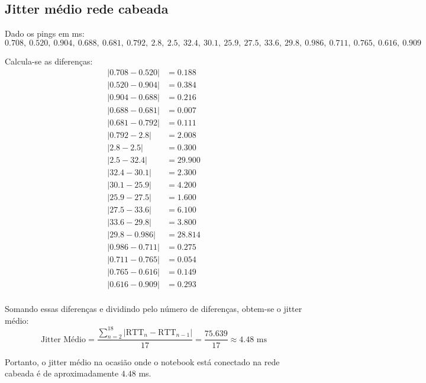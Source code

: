 \documentclass[a4paper,12pt]{article}
\begin{document}
\subsection*{Jitter médio rede cabeada}

Dado os pings em ms:
\[
0.708, \ 0.520, \ 0.904, \ 0.688, \ 0.681, \ 0.792, \ 2.8, \ 2.5, \ 32.4, \ 30.1,
\ 25.9, \ 27.5, \ 33.6, \ 29.8, \ 0.986, \ 0.711, \ 0.765, \ 0.616, \ 0.909
\]

Calcula-se as diferenças:
\[
\begin{align*}
|0.708 - 0.520| &= 0.188 \\
|0.520 - 0.904| &= 0.384 \\
|0.904 - 0.688| &= 0.216 \\
|0.688 - 0.681| &= 0.007 \\
|0.681 - 0.792| &= 0.111 \\
|0.792 - 2.8| &= 2.008 \\
|2.8 - 2.5| &= 0.300 \\
|2.5 - 32.4| &= 29.900 \\
|32.4 - 30.1| &= 2.300 \\
|30.1 - 25.9| &= 4.200 \\
|25.9 - 27.5| &= 1.600 \\
|27.5 - 33.6| &= 6.100 \\
|33.6 - 29.8| &= 3.800 \\
|29.8 - 0.986| &= 28.814 \\
|0.986 - 0.711| &= 0.275 \\
|0.711 - 0.765| &= 0.054 \\
|0.765 - 0.616| &= 0.149 \\
|0.616 - 0.909| &= 0.293 \\
\end{align*}
\]

Somando essas diferenças e dividindo pelo número de diferenças, obtem-se o jitter médio:
\[
\text{Jitter Médio} = \frac{\sum_{n=2}^{18} |\text{RTT}_n - \text{RTT}_{n-1}|}{17} = \frac{75.639}{17} \approx 4.48 \text{ ms}
\]

Portanto, o jitter médio na ocasião onde o notebook está conectado na rede cabeada é de aproximadamente \( 4.48 \) ms.
\end{document}

